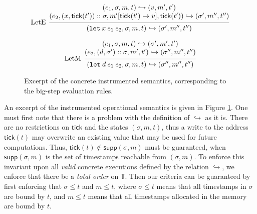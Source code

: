 \documentclass[acmsmall,screen,review]{acmart}\settopmatter{printfolios=true,printccs=false,printacmref=false}
\theoremstyle{acmdefinition}
\newcommand*{\cons}{::}
\newcommand*{\modid}{d}
\newcommand*{\Time}{\mathbb{T}}
\newcommand*{\ctx}{\sigma}
\newcommand*{\mem}{m}
\newcommand*{\semarrow}{\hookrightarrow}
\newcommand*{\tick}{\mathsf{tick}}
\begin{document}
\begin{figure}[t!]
  \[
    \begin{prooftree}
      \hypo{
        \begin{matrix}
          (e_{1}, \ctx, \mem, t)
          \semarrow
          (v, \mem', t') \\
          (e_{2}, (x, \tick(t'))\cons \ctx, \mem'[\tick(t')\mapsto v], \tick(t'))
          \semarrow
          (\ctx', \mem'', t'')
        \end{matrix}
      }
      \infer[left label=LetE]1{
      (\mathtt{let}\:x\:e_1\:e_2, \ctx, \mem, t)
      \semarrow
      (\ctx', \mem'', t'')
      }
    \end{prooftree}
  \]

  \[
    \begin{prooftree}
      \hypo{
        \begin{matrix}
          (e_{1}, \ctx, \mem, t)
          \semarrow
          (\ctx', \mem', t') \\
          (e_{2}, (\modid, \ctx')\cons \ctx, \mem', t')
          \semarrow
          (\ctx'', \mem'', t'')
        \end{matrix}
      }
      \infer[left label=LetM]1{
      (\mathtt{let}\:\modid\:e_{1}\:e_{2}, \ctx, \mem, t)
      \semarrow
      (\ctx'', \mem'', t'')
      }
    \end{prooftree}
  \]
  \caption{Excerpt of the concrete instrumented semantics, corresponding to the big-step evaluation rules.}
  \label{fig:concreach}
\end{figure}

An excerpt of the instrumented operational semantics is given in Figure \ref{fig:concreach}.
One must first note that there is a problem with the definition of $\semarrow$ as it is.
There are no restrictions on $\tick$ and the states $(\ctx,\mem,t)$, thus a write to the address $\tick(t)$ may overwrite an existing value that may be used for future computations.
Thus, $\tick(t)\not\in\mathsf{supp}(\ctx,\mem)$ must be guaranteed, when $\mathsf{supp}(\ctx,\mem)$ is the set of timestamps reachable from $(\ctx,\mem)$.
To enforce this invariant upon all \emph{valid} concrete executions defined by the relation $\semarrow$, we enforce that there be a \emph{total order} on $\Time$.
Then our criteria can be guaranteed by first enforcing that $\ctx\le t$ and $\mem\le t$, where $\ctx\le t$ means that all timestamps in $\ctx$ are bound by $t$, and $\mem\le t$ means that all timestamps allocated in the memory are bound by $t$.
\end{document}
